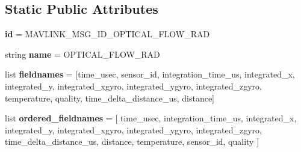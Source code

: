 \subsection*{Static Public Attributes}
\begin{DoxyCompactItemize}
\item 
\mbox{\label{classpymavlink_1_1dialects_1_1v10_1_1MAVLink__optical__flow__rad__message_ae6055988bf4f951fe4670db614c81133}} 
{\bfseries id} = M\+A\+V\+L\+I\+N\+K\+\_\+\+M\+S\+G\+\_\+\+I\+D\+\_\+\+O\+P\+T\+I\+C\+A\+L\+\_\+\+F\+L\+O\+W\+\_\+\+R\+AD
\item 
\mbox{\label{classpymavlink_1_1dialects_1_1v10_1_1MAVLink__optical__flow__rad__message_ad139eebca3855f781447cadff999421b}} 
string {\bfseries name} = \textquotesingle{}O\+P\+T\+I\+C\+A\+L\+\_\+\+F\+L\+O\+W\+\_\+\+R\+AD\textquotesingle{}
\item 
\mbox{\label{classpymavlink_1_1dialects_1_1v10_1_1MAVLink__optical__flow__rad__message_a3eccbad48d04b3de123c04ea415a1255}} 
list {\bfseries fieldnames} = \mbox{[}\textquotesingle{}time\+\_\+usec\textquotesingle{}, \textquotesingle{}sensor\+\_\+id\textquotesingle{}, \textquotesingle{}integration\+\_\+time\+\_\+us\textquotesingle{}, \textquotesingle{}integrated\+\_\+x\textquotesingle{}, \textquotesingle{}integrated\+\_\+y\textquotesingle{}, \textquotesingle{}integrated\+\_\+xgyro\textquotesingle{}, \textquotesingle{}integrated\+\_\+ygyro\textquotesingle{}, \textquotesingle{}integrated\+\_\+zgyro\textquotesingle{}, \textquotesingle{}temperature\textquotesingle{}, \textquotesingle{}quality\textquotesingle{}, \textquotesingle{}time\+\_\+delta\+\_\+distance\+\_\+us\textquotesingle{}, \textquotesingle{}distance\textquotesingle{}\mbox{]}
\item 
\mbox{\label{classpymavlink_1_1dialects_1_1v10_1_1MAVLink__optical__flow__rad__message_ac18aa8ea0c511a881ce5ac46abfae64f}} 
list {\bfseries ordered\+\_\+fieldnames} = \mbox{[} \textquotesingle{}time\+\_\+usec\textquotesingle{}, \textquotesingle{}integration\+\_\+time\+\_\+us\textquotesingle{}, \textquotesingle{}integrated\+\_\+x\textquotesingle{}, \textquotesingle{}integrated\+\_\+y\textquotesingle{}, \textquotesingle{}integrated\+\_\+xgyro\textquotesingle{}, \textquotesingle{}integrated\+\_\+ygyro\textquotesingle{}, \textquotesingle{}integrated\+\_\+zgyro\textquotesingle{}, \textquotesingle{}time\+\_\+delta\+\_\+distance\+\_\+us\textquotesingle{}, \textquotesingle{}distance\textquotesingle{}, \textquotesingle{}temperature\textquotesingle{}, \textquotesingle{}sensor\+\_\+id\textquotesingle{}, \textquotesingle{}quality\textquotesingle{} \mbox{]}

\end{DoxyCompactItemize}
